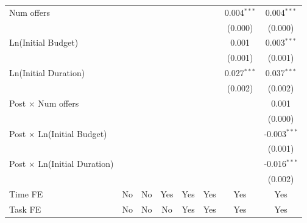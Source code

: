 \documentclass[
]{article}
\begin{document}
\begin{tabular}{lccccccc}
   Num offers                          &                &                &               &               &               & 0.004$^{***}$ & 0.004$^{***}$\\   
                                       &                &                &               &               &               & (0.000)       & (0.000)\\   
   Ln(Initial Budget)                  &                &                &               &               &               & 0.001         & 0.003$^{***}$\\   
                                       &                &                &               &               &               & (0.001)       & (0.001)\\   
   Ln(Initial Duration)                &                &                &               &               &               & 0.027$^{***}$ & 0.037$^{***}$\\   
                                       &                &                &               &               &               & (0.002)       & (0.002)\\   
   Post $\times$ Num offers            &                &                &               &               &               &               & 0.001\\   
                                       &                &                &               &               &               &               & (0.000)\\   
   Post $\times$ Ln(Initial Budget)    &                &                &               &               &               &               & -0.003$^{***}$\\   
                                       &                &                &               &               &               &               & (0.001)\\   
   Post $\times$ Ln(Initial Duration)  &                &                &               &               &               &               & -0.016$^{***}$\\   
                                       &                &                &               &               &               &               & (0.002)\\   
   Time FE                             & No             & No             & Yes           & Yes           & Yes           & Yes           & Yes\\  
   Task FE                             & No             & No             & No            & Yes           & Yes           & Yes           & Yes\\  

\end{tabular}
\end{document}
